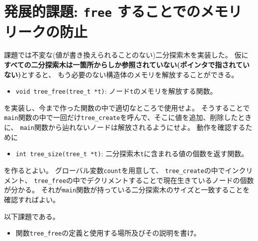 \documentclass[a4paper,twoside,onecolumn,openany,article]{memoir}
\theoremstyle{remark}
\begin{document}
\section{発展的課題: \texttt{free} することでのメモリリークの防止}
課題では不変な(値が書き換えられることのない)二分探索木を実装した。
仮に\textbf{すべての二分探索木は一箇所からしか参照されていない(ポインタで指されていない)}とすると、
もう必要のない構造体のメモリを解放することができる。
\begin{itemize}
\item \texttt{void tree\_free(tree\_t *t)}: ノード\texttt{t}のメモリを解放する関数。
\end{itemize}
を実装し、今まで作った関数の中で適切なところで使用せよ。
そうすることで\texttt{main}関数の中で一回だけ\texttt{tree\_create}を呼んで、そこに値を追加、削除したときに、
\texttt{main}関数から辿れないノードは解放されるようにせよ。
動作を確認するために
\begin{itemize}
\item \texttt{int tree\_size(tree\_t *t)}: 二分探索木\texttt{t}に含まれる値の個数を返す関数。
\end{itemize}
を作るとよい。
グローバル変数\texttt{count}を用意して、
\texttt{tree\_create}の中でインクリメント、
\texttt{tree\_free}の中でデクリメントすることで現在生きているノードの個数が分かる。
それが\texttt{main}関数が持っている二分探索木のサイズと一致することを確認すればよい。

以下課題である。
\begin{itemize}
\item 関数\texttt{tree\_free}の定義と使用する場所及びその説明を書け。
\end{itemize}
\end{document}
